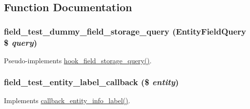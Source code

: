 \subsection{Function Documentation}
\hypertarget{field__test_8module_a775d055844d9136ac44a68c9c254ef05}{
\subsubsection[{field\_\-test\_\-dummy\_\-field\_\-storage\_\-query}]{\setlength{\rightskip}{0pt plus 5cm}field\_\-test\_\-dummy\_\-field\_\-storage\_\-query ({\bf EntityFieldQuery} \$ {\em query})}}
\label{field__test_8module_a775d055844d9136ac44a68c9c254ef05}
Pseudo-\/implements \hyperlink{group__field__storage_gaf46795ee1b678a72b4457b524303c794}{hook\_\-field\_\-storage\_\-query()}. \hypertarget{field__test_8module_a0a7edfbc235c467287808743d0970c06}{
\subsubsection[{field\_\-test\_\-entity\_\-label\_\-callback}]{\setlength{\rightskip}{0pt plus 5cm}field\_\-test\_\-entity\_\-label\_\-callback (\$ {\em entity})}}
\label{field__test_8module_a0a7edfbc235c467287808743d0970c06}
Implements \hyperlink{group__callbacks_gae9464157712e8322955f45a671a8403d}{callback\_\-entity\_\-info\_\-label()}.

